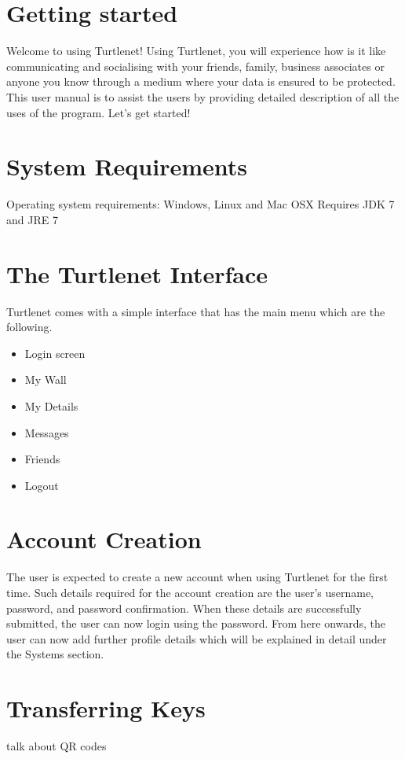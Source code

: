 \section{Getting started}
Welcome to using Turtlenet! Using Turtlenet, you will experience how is it like communicating and socialising with your friends, family, business associates or anyone you know through a medium where your data is ensured to be protected. This user manual is to assist the users by providing detailed description of all the uses of the program. Let's get started!

\section{System Requirements}
Operating system requirements: Windows, Linux and Mac OSX
Requires JDK 7 and JRE 7

\section{The Turtlenet Interface}
Turtlenet comes with a simple interface that has the main menu which are the following.
\begin{itemize}
\item Login screen
\item My Wall
\item My Details
\item Messages
\item Friends
\item Logout
\end{itemize}

\section{Account Creation}
The user is expected to create a new account when using Turtlenet for the first time. Such details required for the account creation are the user's username, password, and password confirmation. When these details are successfully submitted, the user can now login using the password. From here onwards, the user can now add further profile details which will be explained in detail under the Systems section.

\section{Transferring Keys}
talk about QR codes
